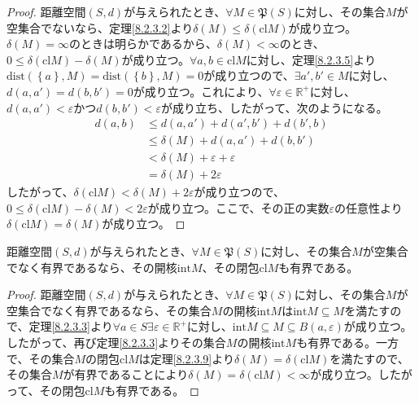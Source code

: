\documentclass[dvipdfmx]{jsarticle}
\begin{document}
\begin{proof}
距離空間$(S,d)$が与えられたとき、$\forall M \in \mathfrak{P}(S)$に対し、その集合$M$が空集合でないなら、定理\ref{8.2.3.2}より$\delta(M) \leq \delta\left( {\mathrm{cl}}M \right)$が成り立つ。$\delta(M) = \infty$のときは明らかであるから、$\delta(M) < \infty$のとき、$0 \leq \delta\left( {\mathrm{cl}}M \right) - \delta(M)$が成り立つ。$\forall a,b \in {\mathrm{cl}}M$に対し、定理\ref{8.2.3.5}より$\mathrm{dist}\left( \left\{ a \right\},M \right) = \mathrm{dist}\left( \left\{ b \right\},M \right) = 0$が成り立つので、$\exists a',b' \in M$に対し、$d\left( a,a' \right) = d\left( b,b' \right) = 0$が成り立つ。これにより、$\forall\varepsilon \in \mathbb{R}^{+}$に対し、$d\left( a,a' \right) < \varepsilon$かつ$d\left( b,b' \right) < \varepsilon$が成り立ち、したがって、次のようになる。
\begin{align*}
d(a,b) &\leq d\left( a,a' \right) + d\left( a',b' \right) + d\left( b',b \right)\\
&\leq \delta(M) + d\left( a,a' \right) + d\left( b,b' \right)\\
&< \delta(M) + \varepsilon + \varepsilon\\
&= \delta(M) + 2\varepsilon
\end{align*}
したがって、$\delta\left( {\mathrm{cl}}M \right) < \delta(M) + 2\varepsilon$が成り立つので、$0 \leq \delta\left( {\mathrm{cl}}M \right) - \delta(M) < 2\varepsilon$が成り立つ。ここで、その正の実数$\varepsilon$の任意性より$\delta\left( {\mathrm{cl}}M \right) = \delta(M)$が成り立つ。
\end{proof}
\begin{thm}\label{8.2.3.10}
距離空間$(S,d)$が与えられたとき、$\forall M \in \mathfrak{P}(S)$に対し、その集合$M$が空集合でなく有界であるなら、その開核${\mathrm{int}}M$、その閉包${\mathrm{cl}}M$も有界である。
\end{thm}
\begin{proof}
距離空間$(S,d)$が与えられたとき、$\forall M \in \mathfrak{P}(S)$に対し、その集合$M$が空集合でなく有界であるなら、その集合$M$の開核${\mathrm{int}}M$は${\mathrm{int}}M \subseteq M$を満たすので、定理\ref{8.2.3.3}より$\forall a \in S\exists\varepsilon \in \mathbb{R}^{+}$に対し、${\mathrm{int}}M \subseteq M \subseteq B(a,\varepsilon)$が成り立つ。したがって、再び定理\ref{8.2.3.3}よりその集合$M$の開核${\mathrm{int}}M$も有界である。一方で、その集合$M$の閉包${\mathrm{cl}}M$は定理\ref{8.2.3.9}より$\delta(M) = \delta\left( {\mathrm{cl}}M \right)$を満たすので、その集合$M$が有界であることにより$\delta(M) = \delta\left( {\mathrm{cl}}M \right) < \infty$が成り立つ。したがって、その閉包${\mathrm{cl}}M$も有界である。
\end{proof}
\end{document}
